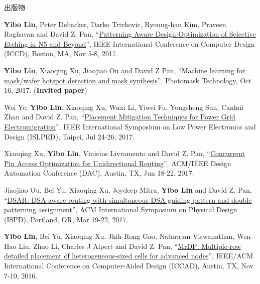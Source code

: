 \begin{rSection}{出版物}
\begin{description}[font=\normalfont]
{}
            

\item[{[C13]}]{
        \textbf{Yibo Lin}, Peter Debacker, Darko Trivkovic, Ryoung-han Kim, Praveen Raghavan and David Z. Pan, 
    ``\href{https://doi.org/10.1109/ICCD.2017.72}{Patterning Aware Design Optimization of Selective Etching in N5 and Beyond}'', 
    IEEE International Conference on Computer Design (ICCD), Boston, MA, Nov 5-8, 2017.
    
}
            

\item[{[C12]}]{
        \textbf{Yibo Lin}, Xiaoqing Xu, Jiaojiao Ou and David Z Pan, 
    ``\href{http://dx.doi.org/10.1117/12.2282943}{Machine learning for mask/wafer hotspot detection and mask synthesis}'', 
    Photomask Technology, Oct 16, 2017.
    (\textbf{Invited paper})
}
            

\item[{[C11]}]{
        Wei Ye, \textbf{Yibo Lin}, Xiaoqing Xu, Wuxi Li, Yiwei Fu, Yongsheng Sun, Canhui Zhan and David Z. Pan, 
    ``\href{https://doi.org/10.1109/ISLPED.2017.8009178}{Placement Mitigation Techniques for Power Grid Electromigration}'', 
    IEEE International Symposium on Low Power Electronics and Design (ISLPED), Taipei, Jul 24-26, 2017.
    
}
            

\item[{[C10]}]{
        Xiaoqing Xu, \textbf{Yibo Lin}, Vinicius Livramento and David Z. Pan, 
    ``\href{https://doi.org/10.1145/3061639.3062214}{Concurrent Pin Access Optimization for Unidirectional Routing}'', 
    ACM/IEEE Design Automation Conference (DAC), Austin, TX, Jun 18-22, 2017.
    
}
            

\item[{[C9]}]{
        Jiaojiao Ou, Bei Yu, Xiaoqing Xu, Joydeep Mitra, \textbf{Yibo Lin} and David Z. Pan, 
    ``\href{https://doi.org/10.1145/3036669.3036677}{DSAR: DSA aware routing with simultaneous DSA guiding pattern and double patterning assignment}'', 
    ACM International Symposium on Physical Design (ISPD), Portland, OR, Mar 19-22, 2017.
    
}
            

\item[{[C8]}]{
        \textbf{Yibo Lin}, Bei Yu, Xiaoqing Xu, Jhih-Rong Gao, Natarajan Viswanathan, Wen-Hao Liu, Zhuo Li, Charles J Alpert and David Z. Pan, 
    ``\href{http://dx.doi.org/10.1145/2966986.2967055}{MrDP: Multiple-row detailed placement of heterogeneous-sized cells for advanced nodes}'', 
    IEEE/ACM International Conference on Computer-Aided Design (ICCAD), Austin, TX, Nov 7-10, 2016.
    
}
\end{description}
\end{rSection}
